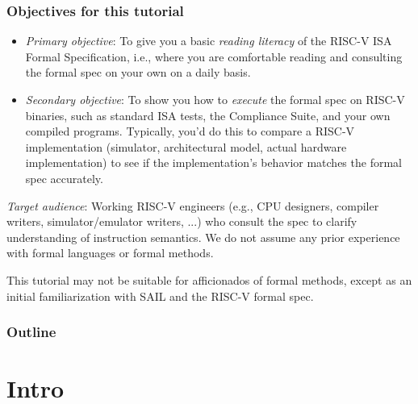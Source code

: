 \documentclass[aspectratio=169]{beamer}
\newcommand{\slidefont}{\scriptsize}
\begin{document}

\begin{frame}
  \frametitle{Objectives for this tutorial}

  \slidefont

  \begin{itemize}
    \item \emph{Primary objective}: To give you a basic \emph{reading
      literacy} of the RISC-V ISA Formal Specification, i.e., where
      you are comfortable reading and consulting the formal spec on
      your own on a daily basis.

    \item \emph{Secondary objective}: To show you how to \emph{execute} the
      formal spec on RISC-V binaries, such as standard ISA tests, the
      Compliance Suite, and your own compiled programs.  Typically,
      you'd do this to compare a RISC-V implementation (simulator,
      architectural model, actual hardware implementation) to see if
      the implementation's behavior matches the formal spec
      accurately.

 \end{itemize}

 \emph{Target audience}: Working RISC-V engineers (e.g., CPU
 designers, compiler writers, simulator/emulator writers, ...) who
 consult the spec to clarify understanding of instruction semantics.
 We do not assume any prior experience with formal languages or formal
 methods.

 \vspace{1ex}

 This tutorial may not be suitable for afficionados of formal methods,
 except as an initial familiarization with SAIL and the RISC-V formal
 spec.

\end{frame}


\begin{frame}
  \frametitle{Outline}
  \tableofcontents
\end{frame}

\section{Intro}

\end{document}

